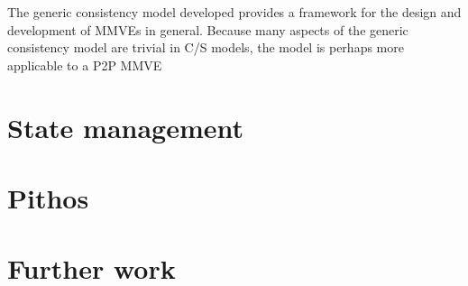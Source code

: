 The generic consistency model developed provides a framework for the design and development of MMVEs in general. Because many aspects of the generic consistency model are trivial in C/S models, the model is perhaps more applicable to a P2P MMVE

\section{State management}

\section{Pithos}


\section{Further work}
\label{further_work}
